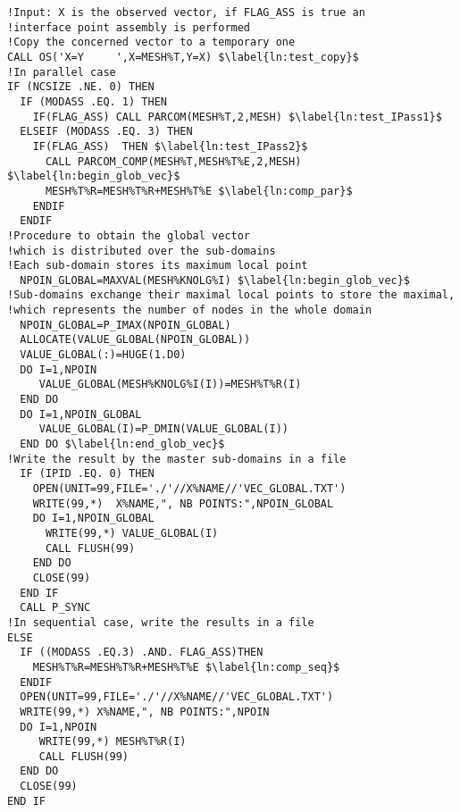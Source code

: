 \begin{lstlisting}[language=TelFortran, caption={The BIEF\_OBJ structure in \texttt{glob\_vec}},label={lst:GlobVec},escapechar=\$]
!Input: X is the observed vector, if FLAG_ASS is true an
!interface point assembly is performed
!Copy the concerned vector to a temporary one
CALL OS('X=Y     ',X=MESH%T,Y=X) $\label{ln:test_copy}$
!In parallel case
IF (NCSIZE .NE. 0) THEN
  IF (MODASS .EQ. 1) THEN
    IF(FLAG_ASS) CALL PARCOM(MESH%T,2,MESH) $\label{ln:test_IPass1}$
  ELSEIF (MODASS .EQ. 3) THEN
    IF(FLAG_ASS)  THEN $\label{ln:test_IPass2}$
      CALL PARCOM_COMP(MESH%T,MESH%T%E,2,MESH)   $\label{ln:begin_glob_vec}$
      MESH%T%R=MESH%T%R+MESH%T%E $\label{ln:comp_par}$
    ENDIF
  ENDIF
!Procedure to obtain the global vector
!which is distributed over the sub-domains
!Each sub-domain stores its maximum local point
  NPOIN_GLOBAL=MAXVAL(MESH%KNOLG%I) $\label{ln:begin_glob_vec}$
!Sub-domains exchange their maximal local points to store the maximal,
!which represents the number of nodes in the whole domain
  NPOIN_GLOBAL=P_IMAX(NPOIN_GLOBAL)
  ALLOCATE(VALUE_GLOBAL(NPOIN_GLOBAL))
  VALUE_GLOBAL(:)=HUGE(1.D0)
  DO I=1,NPOIN
     VALUE_GLOBAL(MESH%KNOLG%I(I))=MESH%T%R(I)
  END DO
  DO I=1,NPOIN_GLOBAL
     VALUE_GLOBAL(I)=P_DMIN(VALUE_GLOBAL(I))
  END DO $\label{ln:end_glob_vec}$
!Write the result by the master sub-domains in a file
  IF (IPID .EQ. 0) THEN
    OPEN(UNIT=99,FILE='./'//X%NAME//'VEC_GLOBAL.TXT')
    WRITE(99,*)  X%NAME,", NB POINTS:",NPOIN_GLOBAL
    DO I=1,NPOIN_GLOBAL
      WRITE(99,*) VALUE_GLOBAL(I)
      CALL FLUSH(99)
    END DO
    CLOSE(99)
  END IF
  CALL P_SYNC
!In sequential case, write the results in a file
ELSE
  IF ((MODASS .EQ.3) .AND. FLAG_ASS)THEN
    MESH%T%R=MESH%T%R+MESH%T%E $\label{ln:comp_seq}$
  ENDIF
  OPEN(UNIT=99,FILE='./'//X%NAME//'VEC_GLOBAL.TXT')
  WRITE(99,*) X%NAME,", NB POINTS:",NPOIN
  DO I=1,NPOIN
     WRITE(99,*) MESH%T%R(I)
     CALL FLUSH(99)
  END DO
  CLOSE(99)
END IF
\end{lstlisting}
%
